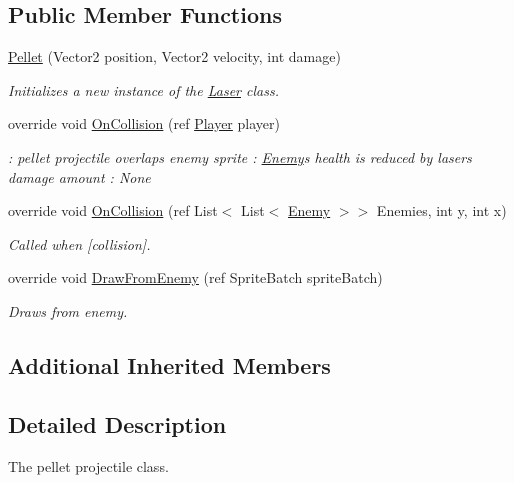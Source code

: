 \subsection*{Public Member Functions}
\begin{DoxyCompactItemize}
\item 
\hyperlink{classXaria_1_1Projectiles_1_1Pellet_a5244aca8ce56559000ecd559f9e45005}{Pellet} (Vector2 position, Vector2 velocity, int damage)
\begin{DoxyCompactList}\small\item\em Initializes a new instance of the \hyperlink{classXaria_1_1Projectiles_1_1Laser}{Laser} class. \end{DoxyCompactList}\item 
override void \hyperlink{classXaria_1_1Projectiles_1_1Pellet_a2491ac1fdf3e4ea69354e1624d7ff690}{On\+Collision} (ref \hyperlink{classXaria_1_1Player}{Player} player)
\begin{DoxyCompactList}\small\item\em \+: pellet projectile overlaps enemy sprite \+: \hyperlink{classXaria_1_1Enemy}{Enemy}\textquotesingle{}s health is reduced by laser\textquotesingle{}s damage amount \+: None \end{DoxyCompactList}\item 
override void \hyperlink{classXaria_1_1Projectiles_1_1Pellet_ae45215e4e6ea94203472cabb911c52d6}{On\+Collision} (ref List$<$ List$<$ \hyperlink{classXaria_1_1Enemy}{Enemy} $>$$>$ Enemies, int y, int x)
\begin{DoxyCompactList}\small\item\em Called when \mbox{[}collision\mbox{]}. \end{DoxyCompactList}\item 
override void \hyperlink{classXaria_1_1Projectiles_1_1Pellet_a86ecd20381a12b3289203145687f27e8}{Draw\+From\+Enemy} (ref Sprite\+Batch sprite\+Batch)
\begin{DoxyCompactList}\small\item\em Draws from enemy. \end{DoxyCompactList}\end{DoxyCompactItemize}
\subsection*{Additional Inherited Members}


\subsection{Detailed Description}
The pellet projectile class. 


